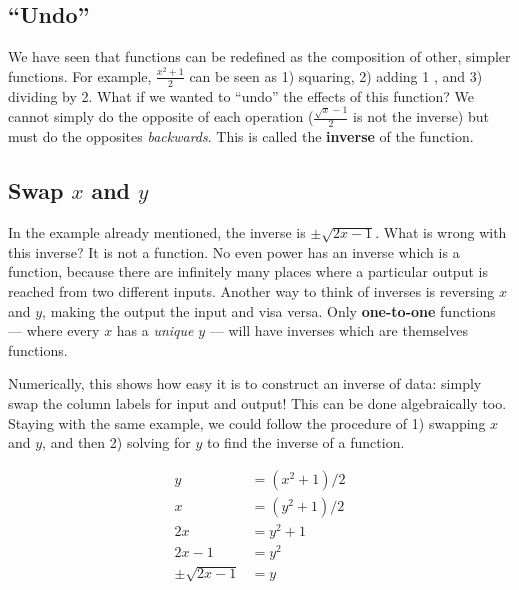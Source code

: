 
\subsection{``Undo''}



We have seen that functions can be redefined as the composition of other, simpler
functions.  For example, $\frac{x^2+1}{2}$ can be seen as 1) squaring, 2) adding 1
, and 3) dividing by 2.  What if we wanted to ``undo'' the effects of this function?
We cannot simply do the opposite of each operation ($\frac{\sqrt{x} -1}{2}$ is not
the inverse) but must do the opposites \emph{backwards}.  This is called the
\textbf{inverse} of the function.  

\subsection{Swap $x$ and $y$}
In the example already mentioned, the inverse is $\pm\sqrt{2x-1}$.  What is wrong with 
this inverse?  It is not a function.  No even power has an inverse which is a function, because
there are infinitely many places where a particular output is reached from two different inputs.
Another way to think of inverses is reversing $x$ and $y$, making the output the input and
visa versa.  Only \textbf{one-to-one} functions --- where every $x$ has a \emph{unique}
$y$ --- will have inverses which are themselves functions.

Numerically, this shows how easy it is to construct an inverse of data: simply swap the
column labels for input and output!   This can be done algebraically too.  Staying with
the same example, we could follow the procedure of 1) swapping $x$ and $y$, and then
2) solving for $y$ to find the inverse of a function.

\begin{align*}
	y &= (x^2+1)/2 \\
	x &= (y^2+1)/2\\
	2x &= y^2+1\\
	2x - 1 &= y^2 \\
	\pm\sqrt{2x-1} &= y\\
\end{align*}


